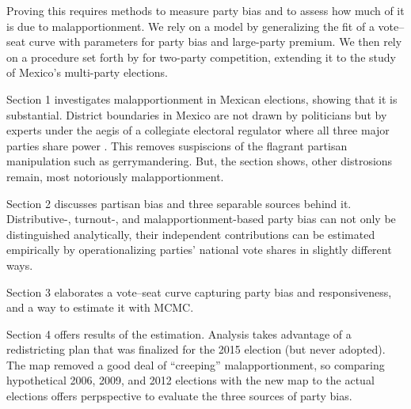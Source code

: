 \documentclass[letter,12pt]{article}
\begin{document}
Proving this requires methods to measure party bias and to assess how much of it is due to malapportionment. We rely on a model by \citet{king.1990elRespBiasMultiparty} generalizing the fit of a vote--seat curve with parameters for party bias and large-party premium. We then rely on a procedure set forth by \citet{grofman.etalBiasMalapp.1997} for two-party competition, extending it to the study of Mexico's multi-party elections. 

Section 1 investigates malapportionment in Mexican elections, showing that it is substantial. District boundaries in Mexico are not drawn by politicians but by experts under the aegis of a collegiate electoral regulator where all three major parties share power \citep{estevez.magar.rosas.2008}. This removes suspiscions of the flagrant partisan manipulation such as gerrymandering. But, the section shows, other distrosions remain, most notoriously malapportionment. 

Section 2 discusses partisan bias and three separable sources behind it. Distributive-, turnout-, and malapportionment-based party bias can not only be distinguished analytically, their independent contributions can be estimated empirically by operationalizing parties' national vote shares in slightly different ways. 

Section 3 elaborates a vote--seat curve capturing party bias and responsiveness, and a way to estimate it with MCMC. 

Section 4 offers results of the estimation. Analysis takes advantage of a redistricting plan that was finalized for the 2015 election (but never adopted). The map removed a good deal of ``creeping'' malapportionment, so comparing hypothetical 2006, 2009, and 2012 elections with the new map to the actual elections offers perpspective to evaluate the three sources of party bias. 


\end{document}
